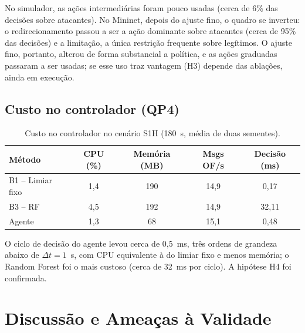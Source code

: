 \documentclass[12pt]{article}
\begin{document}
No simulador, as ações intermediárias foram pouco usadas (cerca de 6\% das
decisões sobre atacantes). No Mininet, depois do ajuste fino, o quadro se
inverteu: o redirecionamento passou a ser a ação dominante sobre atacantes
(cerca de 95\% das decisões) e a limitação, a única restrição frequente sobre
legítimos. O ajuste fino, portanto, alterou de forma substancial a política,
e as ações graduadas passaram a ser usadas; se esse uso traz vantagem (H3)
depende das ablações, ainda em execução.

\subsection{Custo no controlador (QP4)}

\begin{table}[ht]
\centering
\caption{Custo no controlador no cenário S1H (180~s, média de duas sementes).}
\label{tab:res-custo}
\footnotesize
\begin{tabular}{@{}lcccc@{}}
\toprule
\textbf{Método} & \textbf{CPU (\%)} & \textbf{Memória (MB)} &
\textbf{Msgs OF/s} & \textbf{Decisão (ms)} \\
\midrule
B1 -- Limiar fixo & 1,4 & 190 & 14,9 & 0,17 \\
B3 -- RF          & 4,5 & 192 & 14,9 & 32,11 \\
Agente            & 1,3 & 68  & 15,1 & 0,48 \\
\bottomrule
\end{tabular}
\end{table}

O ciclo de decisão do agente levou cerca de 0,5~ms, três ordens de grandeza
abaixo de $\Delta t=1$~s, com CPU equivalente à do limiar fixo e menos
memória; o Random Forest foi o mais custoso (cerca de 32~ms por ciclo). A
hipótese H4 foi confirmada.

\section{Discussão e Ameaças à Validade}\label{sec:discussao}
\end{document}
